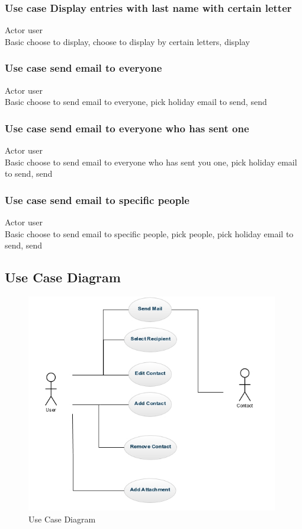 \documentclass{article}
\begin{document}
\subsubsection*{Use case Display entries with last name with certain letter}
Actor user \\
Basic choose to display, choose to display by certain letters, display \\
 
\subsubsection*{Use case send email to everyone}
Actor user \\
Basic choose to send email to everyone, pick holiday email to send, send \\
 
\subsubsection*{Use case send email to everyone who has sent one}
Actor user \\
Basic choose to send email to everyone who has sent you one, pick holiday email to send, send \\
 
\subsubsection*{Use case send email to specific people}
Actor user \\
Basic choose to send email to specific people, pick people, pick holiday email to send, send \\

\subsection*{Use Case Diagram}
\begin{figure}[H]
\centering
\includegraphics[width=110mm]{img/finalDiagrams/UseCaseDiagram.jpg}
\caption{Use Case Diagram \label{useCase}}
\end{figure}
\end{document}
